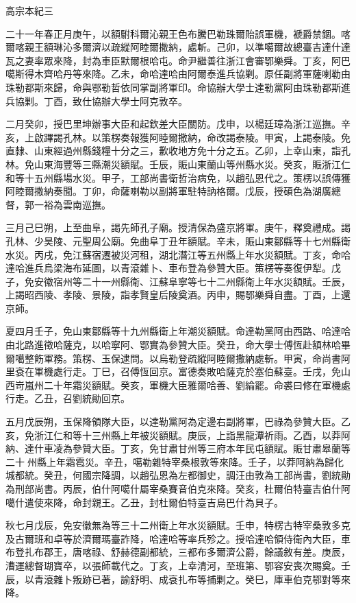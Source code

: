 
\begin{pinyinscope}
高宗本紀三

二十一年春正月庚午，以額駙科爾沁親王色布騰巴勒珠爾貽誤軍機，褫爵禁錮。喀爾喀親王額琳沁多爾濟以疏縱阿睦爾撒納，處斬。己卯，以準噶爾故總臺吉達什達瓦之妻率眾來降，封為車臣默爾根哈屯。命尹繼善往浙江會審鄂樂舜。丁亥，阿巴噶斯得木齊哈丹等來降。乙未，命哈達哈由阿爾泰進兵協剿。原任副將軍薩喇勒由珠勒都斯來歸，命與鄂勒哲依同掌副將軍印。命協辦大學士達勒黨阿由珠勒都斯進兵協剿。丁酉，致仕協辦大學士阿克敦卒。

二月癸卯，授巴里坤辦事大臣和起欽差大臣關防。戊申，以楊廷璋為浙江巡撫。辛亥，上啟蹕謁孔林。以策楞奏報獲阿睦爾撒納，命改謁泰陵。甲寅，上謁泰陵。免直隸、山東經過州縣錢糧十分之三，歉收地方免十分之五。乙卯，上幸山東，詣孔林。免山東海豐等三縣潮災額賦。壬辰，賑山東蘭山等州縣水災。癸亥，賑浙江仁和等十五州縣場水災。甲子，工部尚書衛哲治病免，以趙弘恩代之。策楞以誤傳獲阿睦爾撒納奏聞。丁卯，命薩喇勒以副將軍駐特訥格爾。戊辰，授碩色為湖廣總督，郭一裕為雲南巡撫。

三月己巳朔，上至曲阜，謁先師孔子廟。授清保為盛京將軍。庚午，釋奠禮成。謁孔林、少昊陵、元聖周公廟。免曲阜丁丑年額賦。辛未，賑山東鄒縣等十七州縣衛水災。丙戌，免江蘇宿遷被災河租，湖北潛江等五州縣上年水災額賦。丁亥，命哈達哈進兵烏梁海布延圖，以青滾雜卜、車布登為參贊大臣。策楞等奏復伊犁。戊子，免安徽宿州等二十一州縣衛、江蘇阜寧等七十二州縣衛上年水災額賦。壬辰，上謁昭西陵、孝陵、景陵，詣孝賢皇后陵奠酒。丙申，賜鄂樂舜自盡。丁酉，上還京師。

夏四月壬子，免山東鄒縣等十九州縣衛上年潮災額賦。命達勒黨阿由西路、哈達哈由北路進徵哈薩克，以哈寧阿、鄂實為參贊大臣。癸丑，命大學士傅恆赴額林哈畢爾噶整飭軍務。策楞、玉保逮問。以烏勒登疏縱阿睦爾撒納處斬。甲寅，命尚書阿里袞在軍機處行走。丁巳，召傅恆回京。富德奏敗哈薩克於塞伯蘇臺。壬戌，免山西岢嵐州二十年霜災額賦。癸亥，軍機大臣雅爾哈善、劉綸罷。命裘曰修在軍機處行走。乙丑，召劉統勛回京。

五月戊辰朔，玉保降領隊大臣，以達勒黨阿為定邊右副將軍，巴祿為參贊大臣。乙亥，免浙江仁和等十三州縣上年被災額賦。庚辰，上詣黑龍潭祈雨。乙酉，以莽阿納、達什車凌為參贊大臣。丁亥，免甘肅甘州等三府本年民屯額賦。賑甘肅皋蘭等二十州縣上年霜雹災。辛丑，噶勒雜特宰桑根敦等來降。壬子，以莽阿納為歸化城都統。癸丑，何國宗降調，以趙弘恩為左都御史，調汪由敦為工部尚書，劉統勛為刑部尚書。丙辰，伯什阿噶什屬宰桑賽音伯克來降。癸亥，杜爾伯特臺吉伯什阿噶什遣使來降，命封親王。乙丑，封杜爾伯特臺吉烏巴什為貝子。

秋七月戊辰，免安徽無為等三十二州衛上年水災額賦。壬申，特楞古特宰桑敦多克及古爾班和卓等於濟爾瑪臺詐降，哈達哈等率兵殄之。授哈達哈領侍衛內大臣，車布登扎布郡王，唐喀祿、舒赫德副都統，三都布多爾濟公爵，餘議敘有差。庚辰，漕運總督瑚寶卒，以張師載代之。丁亥，上幸清河，至班第、鄂容安喪次賜奠。壬辰，以青滾雜卜叛跡已著，諭舒明、成袞扎布等捕剿之。癸巳，庫車伯克鄂對等來降。


\end{pinyinscope}
